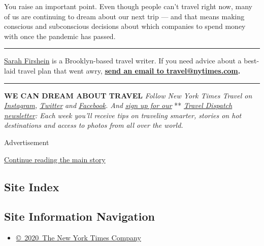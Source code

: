You raise an important point. Even though people can't travel right now,
many of us are continuing to dream about our next trip --- and that
means making conscious and subconscious decisions about which companies
to spend money with once the pandemic has passed.

\begin{center}\rule{0.5\linewidth}{\linethickness}\end{center}

\href{https://twitter.com/sfirshein?lang=en}{Sarah Firshein} is a
Brooklyn-based travel writer. If you need advice about a best-laid
travel plan that went awry,
\textbf{\href{mailto:travel@nytimes.com}{send an email to
travel@nytimes.com}.}

\begin{center}\rule{0.5\linewidth}{\linethickness}\end{center}

\textbf{WE CAN DREAM ABOUT TRAVEL} \emph{Follow New York Times Travel
on}
\href{https://www.instagram.com/nytimestravel/}{\emph{Instagram}}\emph{,}
\href{https://twitter.com/nytimestravel}{\emph{Twitter}} \emph{and}
\href{https://www.facebook.com/nytimestravel/}{\emph{Facebook}}\emph{.
And}
\href{https://www.nytimes.com/newsletters/traveldispatch?action=click\&module=inline\&pgtype=Article}{\emph{sign
up for our}} **
\href{https://www.nytimes.com/newsletters/traveldispatch}{\emph{Travel
Dispatch newsletter}}\emph{: Each week you'll receive tips on traveling
smarter, stories on hot destinations and access to photos from all over
the world.}

Advertisement

\protect\hyperlink{after-bottom}{Continue reading the main story}

\hypertarget{site-index}{%
\subsection{Site Index}\label{site-index}}

\hypertarget{site-information-navigation}{%
\subsection{Site Information
Navigation}\label{site-information-navigation}}

\begin{itemize}
\tightlist
\item
  \href{https://help.nytimes.com/hc/en-us/articles/115014792127-Copyright-notice}{©~2020~The
  New York Times Company}
\end{itemize}

